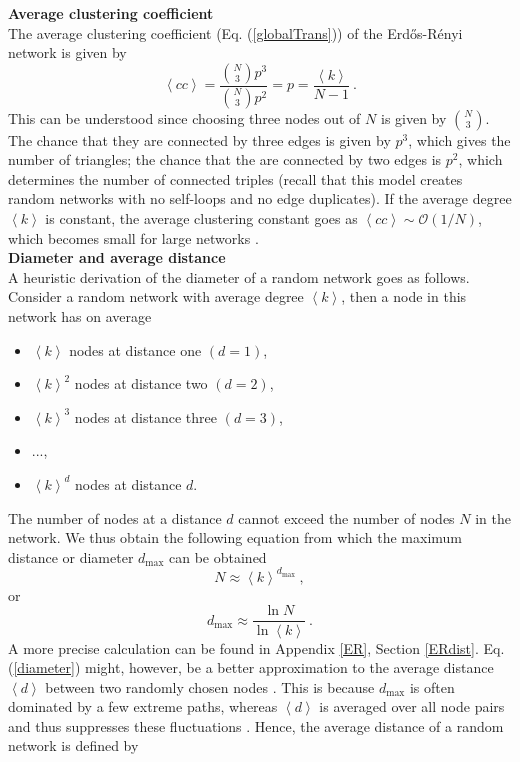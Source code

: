\documentclass[11 pt , letterpaper , twoside , openright]{book}
\begin{document}
\textbf{Average clustering coefficient}\\
\newline
The average clustering coefficient (Eq. (\ref{globalTrans})) of the Erd\H{o}s-R\'{e}nyi network is given by \cite{Clauset2011}
\begin{equation}\label{C}
	\left<cc\right> = \frac{\binom{N}{3}p^3}{\binom{N}{3}p^2} = p = \frac{\left<k\right>}{N-1} \ .
\end{equation}
This can be understood since choosing three nodes out of $N$ is given by $\binom{N}{3}$. The chance that they are connected by three edges is given by $p^3$, which gives the number of triangles; the chance that the are connected by two edges is $p^2$, which determines the number of connected triples (recall that this model creates random networks with no self-loops and no edge duplicates). If the average degree $\left<k\right>$ is constant, the average clustering constant goes as $\left<cc\right> \sim \mathcal{O}(1/N)$, which becomes small for large networks \cite{Clauset2011}. \\
\newline
\textbf{Diameter and average distance}\\
\newline
A heuristic derivation of the diameter of a random network goes as follows. Consider a random network with average degree $\left<k\right>$, then a node in this network has on average \cite{Albert2014}
\begin{itemize}
	\item $\left<k\right>$ nodes at distance one $(d=1)$,
	\item $\left<k\right>^2$ nodes at distance two $(d=2)$,
	\item $\left<k\right>^3$ nodes at distance three $(d=3)$,
	\item ...,
	\item $\left<k\right>^d$ nodes at distance $d$.
\end{itemize}
The number of nodes at a distance $d$ cannot exceed the number of nodes $N$ in the network. We thus obtain the following equation from which the maximum distance or diameter $d_{\textrm{max}}$ can be obtained
\begin{equation}
	N \approx \left<k\right>^{d_{\textrm{max}}} \ ,
\end{equation}
or 
\begin{equation}\label{diameter}
	d_{\textrm{max}} \approx \frac{\ln{N}}{\ln{\left<k\right>}} \ .
\end{equation}
A more precise calculation can be found in Appendix \ref{ER}, Section \ref{ERdist}. Eq. (\ref{diameter}) might, however, be a better approximation to the average distance $\left<d\right>$ between two randomly chosen nodes \cite{Albert2014}. This is because $d_{\textrm{max}}$ is often dominated by a few extreme paths, whereas $\left<d\right>$ is averaged over all node pairs and thus suppresses these fluctuations \cite{Albert2014}. Hence, the average distance of a random network is defined by \cite{Albert2014}
\end{document}
